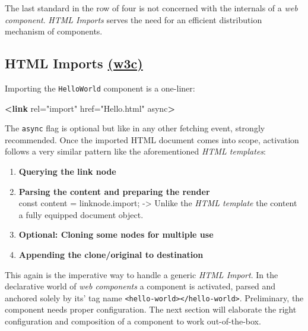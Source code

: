\documentclass[]{article}
\newenvironment{Shaded}{}{}
\newcommand{\KeywordTok}[1]{\textcolor[rgb]{0.00,0.44,0.13}{\textbf{{#1}}}}
\newcommand{\StringTok}[1]{\textcolor[rgb]{0.25,0.44,0.63}{{#1}}}
\newcommand{\OtherTok}[1]{\textcolor[rgb]{0.00,0.44,0.13}{{#1}}}
\begin{document}
The last standard in the row of four is not concerned with the internals
of a \emph{web component}. \emph{HTML Imports} serves the need for an
efficient distribution mechanism of components.

\subsection{\texorpdfstring{HTML Imports
\href{https://www.w3.org/TR/html-imports/}{(w3c)}}{HTML Imports (w3c)}}\label{html-imports-w3c}

Importing the \texttt{HelloWorld} component is a one-liner:

\begin{Shaded}
\begin{Highlighting}[]
\KeywordTok{<link}\OtherTok{ rel=}\StringTok{"import"}\OtherTok{ href=}\StringTok{"Hello.html"}\OtherTok{ async}\KeywordTok{>}
\end{Highlighting}
\end{Shaded}

The \texttt{async} flag is optional but like in any other fetching
event, strongly recommended. Once the imported HTML document comes into
scope, activation follows a very similar pattern like the aforementioned
\emph{HTML templates}:

\begin{enumerate}
\def\labelenumi{\arabic{enumi}.}
\item
  \textbf{Querying the link node}
\item
  \textbf{Parsing the content and preparing the render}\\
  const content = linknode.import; -\textgreater{} Unlike the \emph{HTML
  template} the content a fully equipped document object.
\item
  \textbf{Optional: Cloning some nodes for multiple use}
\item
  \textbf{Appending the clone/original to destination}
\end{enumerate}

This again is the imperative way to handle a generic \emph{HTML Import}.
In the declarative world of \emph{web components} a component is
activated, parsed and anchored solely by its' tag name
\texttt{\textless{}hello-world\textgreater{}\textless{}/hello-world\textgreater{}}.
Preliminary, the component needs proper configuration. The next section
will elaborate the right configuration and composition of a component to
work out-of-the-box.
\end{document}
